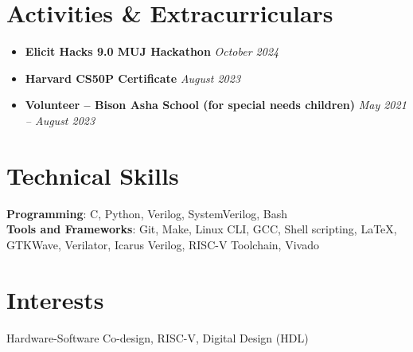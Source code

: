 \documentclass[letterpaper,11pt]{article}
\begin{document}
\section{Activities \& Extracurriculars}
\begin{itemize}[leftmargin=*, itemsep=1pt]
  \item \textbf{Elicit Hacks 9.0 MUJ Hackathon} \hfill \textit{October 2024}
  \item \textbf{Harvard CS50P Certificate} \hfill \textit{August 2023}
  \item \textbf{Volunteer – Bison Asha School (for special needs children)} \hfill \textit{May 2021 -- August 2023}
\end{itemize}

\section{Technical Skills}
\begin{itemize}[leftmargin=0.15in, label={}]
  \small{\item{
    \textbf{Programming}{: C, Python, Verilog, SystemVerilog, Bash} \\
    \textbf{Tools and Frameworks}{: Git, Make, Linux CLI, GCC, Shell scripting, LaTeX, GTKWave, Verilator, Icarus Verilog, RISC-V Toolchain, Vivado}
  }}
\end{itemize}

\section{Interests}
\begin{itemize}[leftmargin=0.15in, label={}]
  \small{\item{
    Hardware-Software Co-design, RISC-V, Digital Design (HDL)
  }}
\end{itemize}
\end{document}
